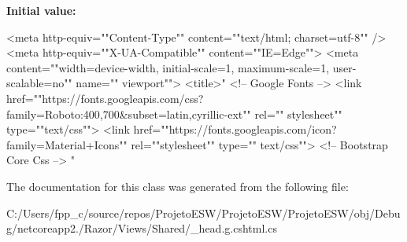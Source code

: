 {\bfseries Initial value\+:}
\begin{DoxyCode}


    <meta http-equiv=\textcolor{stringliteral}{""}Content-Type\textcolor{stringliteral}{""} content=\textcolor{stringliteral}{""}text/html; charset=utf-8\textcolor{stringliteral}{""} />
    <meta http-equiv=\textcolor{stringliteral}{""}X-UA-Compatible\textcolor{stringliteral}{""} content=\textcolor{stringliteral}{""}IE=Edge\textcolor{stringliteral}{""}>
    <meta content=\textcolor{stringliteral}{""}width=device-width, initial-scale=1, maximum-scale=1, user-scalable=no\textcolor{stringliteral}{""} name=\textcolor{stringliteral}{""}
      viewport\textcolor{stringliteral}{""}>
    <title>\textcolor{stringliteral}{"}
\textcolor{stringliteral}{}
\textcolor{stringliteral}{    <!-- Google Fonts -->}
\textcolor{stringliteral}{    <link href="}\textcolor{stringliteral}{"https://fonts.googleapis.com/css?family=Roboto:400,700&subset=latin,cyrillic-ext"}\textcolor{stringliteral}{" rel="}\textcolor{stringliteral}{"
      stylesheet"}\textcolor{stringliteral}{" type="}\textcolor{stringliteral}{"text/css"}\textcolor{stringliteral}{">}
\textcolor{stringliteral}{    <link href="}\textcolor{stringliteral}{"https://fonts.googleapis.com/icon?family=Material+Icons"}\textcolor{stringliteral}{" rel="}\textcolor{stringliteral}{"stylesheet"}\textcolor{stringliteral}{" type="}\textcolor{stringliteral}{"
      text/css"}\textcolor{stringliteral}{">}
\textcolor{stringliteral}{}
\textcolor{stringliteral}{    <!-- Bootstrap Core Css -->}
\textcolor{stringliteral}{    "}
\end{DoxyCode}


The documentation for this class was generated from the following file\+:\begin{DoxyCompactItemize}
\item 
C\+:/\+Users/fpp\+\_\+c/source/repos/\+Projeto\+E\+S\+W/\+Projeto\+E\+S\+W/\+Projeto\+E\+S\+W/obj/\+Debug/netcoreapp2./\+Razor/\+Views/\+Shared/\+\_\+head.\+g.\+cshtml.\+cs\end{DoxyCompactItemize}
